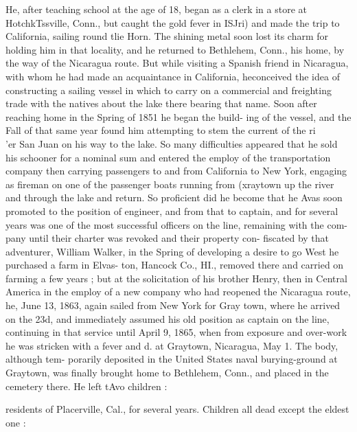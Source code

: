 \documentclass[oneside]{book}
\begin{document}
He, after teaching school at the age of 18, began as a clerk in 
a store at HotchkTssville, Conn., but caught the gold fever in 
ISJri) and made the trip to California, sailing round tlie Horn. 
The shining metal soon lost its charm for holding him in that 
locality, and he returned to Bethlehem, Conn., his home, by 
the way of the Nicaragua route. But while visiting a Spanish 
friend in Nicaragua, with whom he had made an acquaintance 
in California, heconceived the idea of constructing a sailing 
vessel in which to carry on a commercial and freighting trade 
with the natives about the lake there bearing that name. Soon 
after reaching home in the Spring of 1851 he began the build- 
ing of the vessel, and the Fall of that same year found him 
attempting to stem the current of the ri\\'er San Juan on his 
way to the lake. So many difficulties appeared that he sold 
his schooner for a nominal sum and entered the employ of the 
transportation company then carrying passengers to and from 
California to New York, engaging as fireman on one of the 
passenger boats running from (xraytown up the river and 
through the lake and return. So proficient did he become 
that he Avas soon promoted to the position of engineer, and 
from that to captain, and for several years was one of the 
most successful officers on the line, remaining with the com- 
pany until their charter was revoked and their property con- 
fiscated by that adventurer, William Walker, in the Spring of 
developing a desire to go West he purchased a farm in Elvas- 
ton, Hancock Co., HI., removed there and carried on farming 
a few years ; but at the solicitation of his brother Henry, then 
in Central America in the employ of a new company who had 
reopened the Nicaragua route, he, June 13, 1863, again sailed 
from New York for Gray town, where he arrived on the 23d, 
and immediately assumed his old position as captain on the 
line, continuing in that service until April 9, 1865, when from 
exposure and over-work he was stricken with a fever and d. 
at Graytown, Nicaragua, May 1. The body, although tem- 
porarily deposited in the United States naval burying-ground 
at Graytown, was finally brought home to Bethlehem, Conn., 
and placed in the cemetery there. He left tAvo children : 




residents of Placerville, Cal., for several years. Children all 
dead except the eldest one : 
\end{document}
